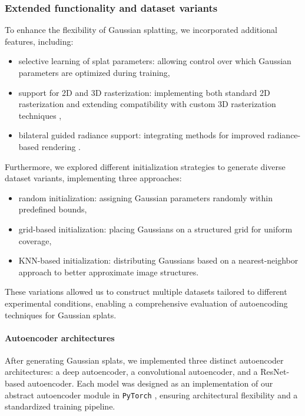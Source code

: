 \subsubsection{Extended functionality and dataset variants}
To enhance the flexibility of Gaussian splatting, we incorporated additional features, including:

\begin{itemize}
    \item selective learning of splat parameters: allowing control over which Gaussian parameters are optimized during training,
    \item support for 2D and 3D rasterization: implementing both standard 2D rasterization and extending compatibility with custom 3D rasterization techniques \cite{kerbl20233dgs},
    \item bilateral guided radiance support: integrating methods for improved radiance-based rendering \cite{wang2024bilateralgr}.
\end{itemize}

Furthermore, we explored different initialization strategies to generate diverse dataset variants, implementing three approaches:

\begin{itemize}
    \item random initialization: assigning Gaussian parameters randomly within predefined bounds,
    \item grid-based initialization: placing Gaussians on a structured grid for uniform coverage,
    \item KNN-based initialization: distributing Gaussians based on a nearest-neighbor approach to better approximate image structures.
\end{itemize}

These variations allowed us to construct multiple datasets tailored to different experimental conditions, enabling a comprehensive evaluation of autoencoding techniques for Gaussian splats.

\paragraph{Autoencoder architectures}
After generating Gaussian splats, we implemented three distinct autoencoder architectures: a deep autoencoder, a convolutional autoencoder, and a ResNet-based autoencoder. Each model was designed as an implementation of our abstract autoencoder module in \texttt{PyTorch} \cite{paszke2019pytorchai}, ensuring architectural flexibility and a standardized training pipeline.

